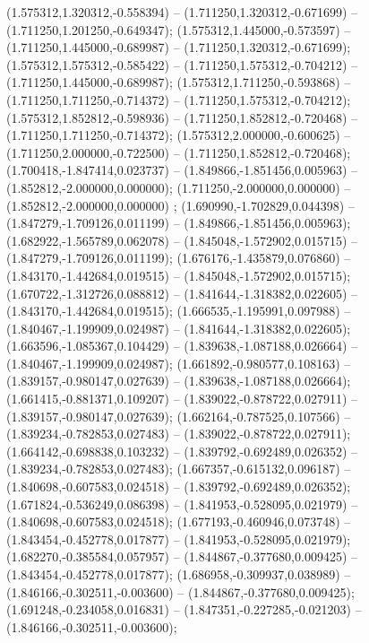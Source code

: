  (1.575312,1.320312,-0.558394) -- (1.711250,1.320312,-0.671699) -- (1.711250,1.201250,-0.649347);
 (1.575312,1.445000,-0.573597) -- (1.711250,1.445000,-0.689987) -- (1.711250,1.320312,-0.671699);
 (1.575312,1.575312,-0.585422) -- (1.711250,1.575312,-0.704212) -- (1.711250,1.445000,-0.689987);
 (1.575312,1.711250,-0.593868) -- (1.711250,1.711250,-0.714372) -- (1.711250,1.575312,-0.704212);
 (1.575312,1.852812,-0.598936) -- (1.711250,1.852812,-0.720468) -- (1.711250,1.711250,-0.714372);
 (1.575312,2.000000,-0.600625) -- (1.711250,2.000000,-0.722500) -- (1.711250,1.852812,-0.720468);
 (1.700418,-1.847414,0.023737) -- (1.849866,-1.851456,0.005963) -- (1.852812,-2.000000,0.000000);
 (1.711250,-2.000000,0.000000) -- (1.852812,-2.000000,0.000000) ;
 (1.690990,-1.702829,0.044398) -- (1.847279,-1.709126,0.011199) -- (1.849866,-1.851456,0.005963);
 (1.682922,-1.565789,0.062078) -- (1.845048,-1.572902,0.015715) -- (1.847279,-1.709126,0.011199);
 (1.676176,-1.435879,0.076860) -- (1.843170,-1.442684,0.019515) -- (1.845048,-1.572902,0.015715);
 (1.670722,-1.312726,0.088812) -- (1.841644,-1.318382,0.022605) -- (1.843170,-1.442684,0.019515);
 (1.666535,-1.195991,0.097988) -- (1.840467,-1.199909,0.024987) -- (1.841644,-1.318382,0.022605);
 (1.663596,-1.085367,0.104429) -- (1.839638,-1.087188,0.026664) -- (1.840467,-1.199909,0.024987);
 (1.661892,-0.980577,0.108163) -- (1.839157,-0.980147,0.027639) -- (1.839638,-1.087188,0.026664);
 (1.661415,-0.881371,0.109207) -- (1.839022,-0.878722,0.027911) -- (1.839157,-0.980147,0.027639);
 (1.662164,-0.787525,0.107566) -- (1.839234,-0.782853,0.027483) -- (1.839022,-0.878722,0.027911);
 (1.664142,-0.698838,0.103232) -- (1.839792,-0.692489,0.026352) -- (1.839234,-0.782853,0.027483);
 (1.667357,-0.615132,0.096187) -- (1.840698,-0.607583,0.024518) -- (1.839792,-0.692489,0.026352);
 (1.671824,-0.536249,0.086398) -- (1.841953,-0.528095,0.021979) -- (1.840698,-0.607583,0.024518);
 (1.677193,-0.460946,0.073748) -- (1.843454,-0.452778,0.017877) -- (1.841953,-0.528095,0.021979);
 (1.682270,-0.385584,0.057957) -- (1.844867,-0.377680,0.009425) -- (1.843454,-0.452778,0.017877);
 (1.686958,-0.309937,0.038989) -- (1.846166,-0.302511,-0.003600) -- (1.844867,-0.377680,0.009425);
 (1.691248,-0.234058,0.016831) -- (1.847351,-0.227285,-0.021203) -- (1.846166,-0.302511,-0.003600);
